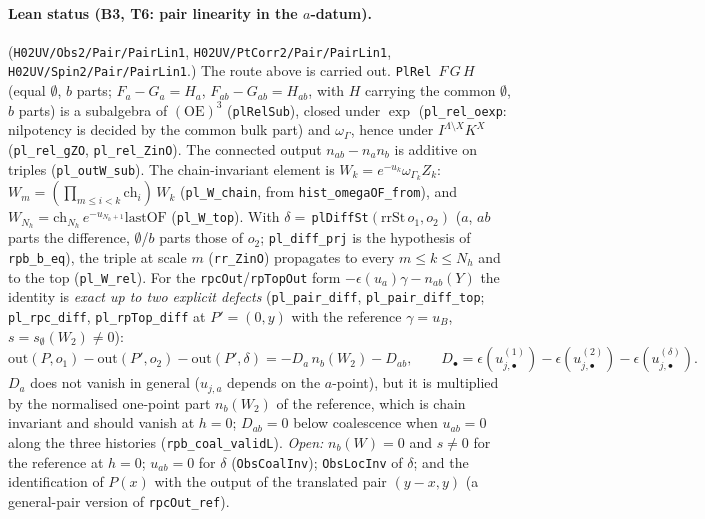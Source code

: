 \documentclass[11pt]{amsart}
\theoremstyle{definition}
\theoremstyle{remark}
\numberwithin{equation}{section}
\begin{document}
\paragraph{Lean status (B3, T6: pair linearity in the $a$-datum).}
(\texttt{H02UV/Obs2/Pair/PairLin1}, \texttt{H02UV/PtCorr2/Pair/PairLin1}, \texttt{H02UV/Spin2/Pair/PairLin1}.) The route above is carried out.
\texttt{PlRel}~$F\,G\,H$ (equal $\emptyset$, $b$ parts; $F_a-G_a=H_a$, $F_{ab}-G_{ab}=H_{ab}$, with $H$ carrying the
common $\emptyset$, $b$ parts) is a subalgebra of $(\mathrm{OE})^3$ (\texttt{plRelSub}), closed under $\exp$
(\texttt{pl\_rel\_oexp}: nilpotency is decided by the common bulk part) and $\omega_\Gamma$, hence under
$I^{\Lambda\setminus X}K^X$ (\texttt{pl\_rel\_gZO}, \texttt{pl\_rel\_ZinO}). The connected output
$n_{ab}-n_an_b$ is additive on triples (\texttt{pl\_outW\_sub}). The chain-invariant element is
$W_k=e^{-u_k}\omega_{\Gamma_k}Z_k$: $W_m=(\prod_{m\le i<k}\mathrm{ch}_i)\,W_k$ (\texttt{pl\_W\_chain}, from
\texttt{hist\_omegaOF\_from}), and $W_{N_h}=\mathrm{ch}_{N_h}\,e^{-u_{N_h+1}}\mathrm{lastOF}$ (\texttt{pl\_W\_top}).
With $\delta=$\,\texttt{plDiffSt}$(\mathrm{rrSt}\,o_1,o_2)$ ($a$, $ab$ parts the difference, $\emptyset$/$b$ parts
those of $o_2$; \texttt{pl\_diff\_prj} is the hypothesis of \texttt{rpb\_b\_eq}), the triple at scale $m$
(\texttt{rr\_ZinO}) propagates to every $m\le k\le N_h$ and to the top (\texttt{pl\_W\_rel}). For the
\texttt{rpcOut}/\texttt{rpTopOut} form $-\epsilon(u_a)\gamma-n_{ab}(Y)$ the identity is \emph{exact up to two explicit
defects} (\texttt{pl\_pair\_diff}, \texttt{pl\_pair\_diff\_top}; \texttt{pl\_rpc\_diff}, \texttt{pl\_rpTop\_diff} at
$P'=(0,y)$ with the reference $\gamma=u_B$, $s=s_\emptyset(W_2)\neq0$):
\[
\mathrm{out}(P,o_1)-\mathrm{out}(P',o_2)-\mathrm{out}(P',\delta)=-D_a\,n_b(W_2)-D_{ab},\qquad
D_\bullet=\epsilon(u^{(1)}_{j,\bullet})-\epsilon(u^{(2)}_{j,\bullet})-\epsilon(u^{(\delta)}_{j,\bullet}).
\]
$D_a$ does not vanish in general ($u_{j,a}$ depends on the $a$-point), but it is multiplied by the normalised
one-point part $n_b(W_2)$ of the reference, which is chain invariant and should vanish at $h=0$; $D_{ab}=0$ below coalescence when $u_{ab}=0$
along the three histories (\texttt{rpb\_coal\_validL}). \emph{Open:} $n_b(W)=0$ and $s\ne0$ for the reference at $h=0$;
$u_{ab}=0$ for $\delta$ (\texttt{ObsCoalInv}); \texttt{ObsLocInv} of $\delta$; and the identification of $P(x)$ with the
output of the translated pair $(y-x,y)$ (a general-pair version of \texttt{rpcOut\_ref}).
\end{document}
